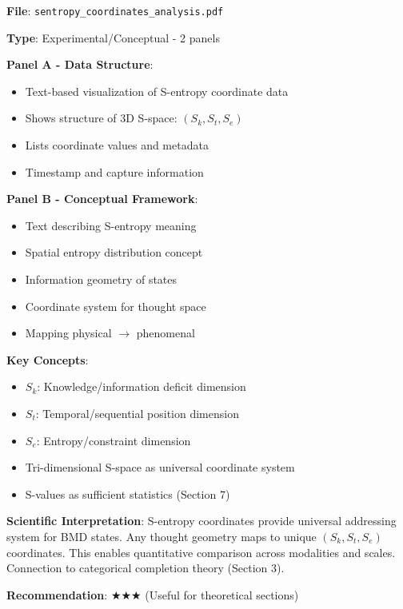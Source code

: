 \documentclass[11pt]{article}
\begin{document}
\textbf{File}: \texttt{sentropy\_coordinates\_analysis.pdf}

\textbf{Type}: Experimental/Conceptual - 2 panels

\textbf{Panel A - Data Structure}:
\begin{itemize}
\item Text-based visualization of S-entropy coordinate data
\item Shows structure of 3D S-space: $(S_k, S_t, S_e)$
\item Lists coordinate values and metadata
\item Timestamp and capture information
\end{itemize}

\textbf{Panel B - Conceptual Framework}:
\begin{itemize}
\item Text describing S-entropy meaning
\item Spatial entropy distribution concept
\item Information geometry of  states
\item Coordinate system for thought space
\item Mapping physical $\to$ phenomenal
\end{itemize}

\textbf{Key Concepts}:
\begin{itemize}
\item $S_k$: Knowledge/information deficit dimension
\item $S_t$: Temporal/sequential position dimension
\item $S_e$: Entropy/constraint dimension
\item Tri-dimensional S-space as universal coordinate system
\item S-values as sufficient statistics (Section 7)
\end{itemize}

\textbf{Scientific Interpretation}:
S-entropy coordinates provide universal addressing system for BMD states. Any thought geometry maps to unique $(S_k, S_t, S_e)$ coordinates. This enables quantitative comparison across modalities and scales. Connection to categorical completion theory (Section 3).

\textbf{Recommendation}: $\bigstar\bigstar\bigstar$ (Useful for theoretical sections)
\end{document}
